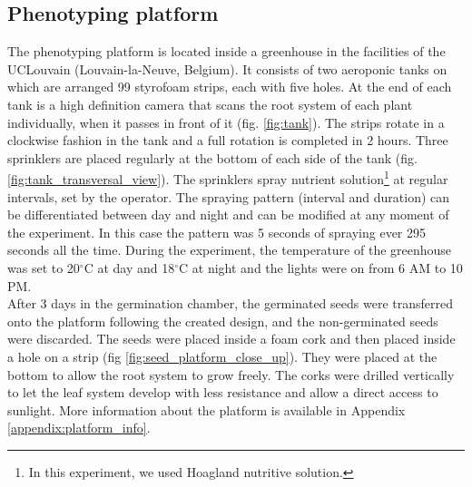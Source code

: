 
\subsection{Phenotyping platform}
The phenotyping platform is located inside a greenhouse in the facilities of the UCLouvain (Louvain-la-Neuve, Belgium). 
It consists of two aeroponic tanks on which are arranged 99 styrofoam strips, each with five holes. 
At the end of each tank is a high definition camera that scans the root system of each plant individually, when it passes in 
front of it (fig. \ref{fig:tank}). 
The strips rotate in a clockwise fashion in the tank and a full rotation is completed in 2 hours. 
Three sprinklers are placed regularly at the bottom of each side of the tank (fig. \ref{fig:tank_transversal_view}). 
The sprinklers spray nutrient solution\footnote{In this experiment, we used Hoagland nutritive solution.} at regular intervals, set by the operator. 
The spraying pattern (interval and duration) can be differentiated between day and night and can be modified at any moment of 
the experiment.
In this case the pattern was 5 seconds of spraying ever 295 seconds all the time.
During the experiment, the temperature of the greenhouse was set to 20$^{\circ}$C at day and 18$^{\circ}$C at night and the 
lights were on from 6 AM to 10 PM.\\

After 3 days in the germination chamber, the germinated seeds were transferred onto the platform following the created design, and the non-germinated seeds were discarded. 
The seeds were placed inside a foam cork and then placed inside a hole on a strip (fig \ref{fig:seed_platform_close_up}). 
They were placed at the bottom to allow the root system to grow freely. 
The corks were drilled vertically to let the leaf system develop with less resistance and allow a direct access to sunlight. 
More information about the platform is available in Appendix \ref{appendix:platform_info}.\\

